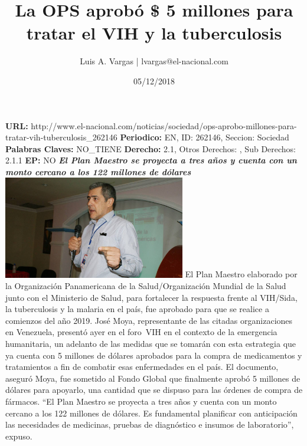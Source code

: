 \documentclass{article}%
\title{\textbf{La OPS aprobó \$ 5 millones para tratar el VIH y la tuberculosis}}%
\author{Luis A. Vargas | lvargas@el{-}nacional.com}%
\date{05/12/2018}%
\begin{document}
%
\normalsize%
\maketitle%
\textbf{URL: }%
http://www.el{-}nacional.com/noticias/sociedad/ops{-}aprobo{-}millones{-}para{-}tratar{-}vih{-}tuberculosis\_262146\newline%
%
\textbf{Periodico: }%
EN, %
ID: %
262146, %
Seccion: %
Sociedad\newline%
%
\textbf{Palabras Claves: }%
NO\_TIENE\newline%
%
\textbf{Derecho: }%
2.1, %
Otros Derechos: %
, %
Sub Derechos: %
2.1.1\newline%
%
\textbf{EP: }%
NO\newline%
\newline%
%
\textbf{\textit{El Plan Maestro se proyecta a tres años y cuenta con un monto cercano a los 122 millones de dólares}}%
\newline%
\newline%
%
\includegraphics[width=300px]{114.jpg}%
\newline%
%
El Plan Maestro elaborado por la Organización Panamericana de la Salud/Organización Mundial de la Salud junto con el Ministerio de Salud, para fortalecer la respuesta frente al VIH/Sida, la tuberculosis y la malaria en el país, fue aprobado para que se realice a comienzos del año 2019. José Moya, representante de las citadas organizaciones en Venezuela, presentó ayer en el foro~VIH en el contexto de la emergencia humanitaria, un adelanto de las medidas que se tomarán con esta estrategia que ya cuenta con 5 millones de dólares aprobados para la compra de medicamentos y tratamientos a fin de combatir esas enfermedades en el país.%
\newline%
%
El documento, aseguró Moya, fue sometido al Fondo Global que finalmente aprobó 5 millones de dólares para apoyarlo, una cantidad que se dispuso para las órdenes de compra de fármacos.%
\newline%
%
“El Plan Maestro se proyecta a tres años y cuenta con un monto cercano a los 122 millones de dólares. Es fundamental planificar con anticipación las necesidades de medicinas, pruebas de diagnóstico e insumos de laboratorio”, expuso.%
\end{document}
